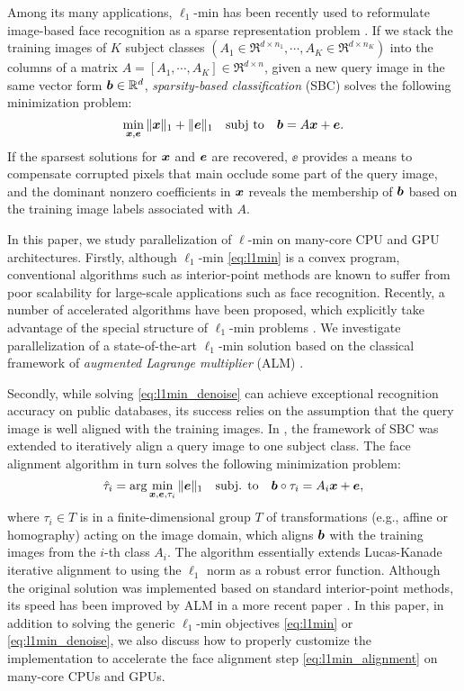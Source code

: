 \documentclass[10pt,twocolumn,letterpaper]{article}
\begin{document}
Among its many applications, $\ell_1$-min has been recently used to reformulate
image-based face recognition as a sparse representation problem
\cite{WrightJ2009-PAMI}.  If we stack the training images of $K$ subject
classes $(A_1\in\Re^{d\times n_1}, \cdots, A_K\in\Re^{d\times n_K})$ into the
columns of a matrix $A = [A_1, \cdots, A_K]\in\Re^{d\times n}$, given a new
query image in the same vector form ${\boldsymbol{b}}\in{\mathbb{R}}^d$, \emph{sparsity-based
classification} (SBC) solves the following minimization problem:
\begin{equation}
\min_{{\boldsymbol{x}}, {\boldsymbol{e}}} \| {\boldsymbol{x}} \|_1 + \|{\boldsymbol{e}}\|_1 \quad \textup{subj to} \quad {\boldsymbol{b}} = A {\boldsymbol{x}} + {\boldsymbol{e}}.
\label{eq:l1min_denoise}
\end{equation}
If the sparsest solutions for ${\boldsymbol{x}}$ and $\boldsymbol{e}$ are recovered, $\ee$ provides a
means to compensate corrupted pixels that main occlude some part of the query
image, and the dominant nonzero coefficients in ${\boldsymbol{x}}$ reveals the membership of
${\boldsymbol{b}}$ based on the training image labels associated with $A$.

In this paper, we study parallelization of $\ell$-min on many-core CPU and GPU
architectures. Firstly, although $\ell_1$-min \eqref{eq:l1min} is a convex
program, conventional algorithms such as interior-point methods
\cite{ChenS2001-SIAM,TibshiraniR1996} are known to suffer from poor scalability
for large-scale applications such as face recognition. Recently, a number of
accelerated algorithms have been proposed, which explicitly take advantage of
the special structure of $\ell_1$-min problems
\cite{LorisI2009,YangA2010-ICIP}. We investigate parallelization of a
state-of-the-art $\ell_1$-min solution based on the classical framework of
\emph{augmented Lagrange multiplier} (ALM)
\cite{BertsekasD2003,YangA2010-ICIP}.

Secondly, while solving \eqref{eq:l1min_denoise} can achieve exceptional
recognition accuracy on public databases, its success relies on the assumption
that the query image is well aligned with the training images. In
\cite{WagnerA2009-CVPR}, the framework of SBC was extended to iteratively align
a query image to one subject class. The face alignment algorithm in turn solves
the following minimization problem:
\begin{equation}
\hat{\tau}_i = \arg\min_{{\boldsymbol{x}}, {\boldsymbol{e}}, \tau_i} \|{\boldsymbol{e}}\|_1\quad \mbox{subj. to}\quad {\boldsymbol{b}}\circ\tau_i = A_i{\boldsymbol{x}} + {\boldsymbol{e}},
\label{eq:l1min_alignment}
\end{equation}
where $\tau_i\in T$ is in a finite-dimensional group $T$ of transformations
(e.g., affine or homography) acting on the image domain, which aligns ${\boldsymbol{b}}$
with the training images from the $i$-th class $A_i$. The algorithm essentially
extends Lucas-Kanade iterative alignment \cite{LucasB1981} to using the
$\ell_1$ norm as a robust error function.  Although the original solution
\cite{WagnerA2009-CVPR} was implemented based on standard interior-point
methods, its speed has been improved by ALM in a more recent paper
\cite{WagnerA2011-PAMI}. In this paper, in addition to solving the generic
$\ell_1$-min objectives \eqref{eq:l1min} or \eqref{eq:l1min_denoise}, we also
discuss how to properly customize the implementation to accelerate the face
alignment step \eqref{eq:l1min_alignment} on many-core CPUs and GPUs.
\end{document}
